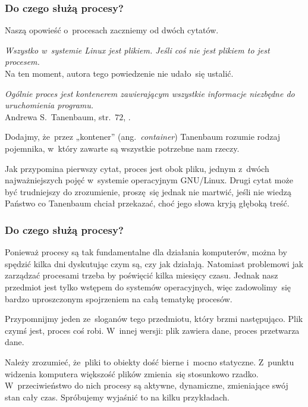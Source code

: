 \documentclass[10pt,t]{beamer}
\begin{document}
\begin{frame}
  \frametitle{Do czego służą procesy?}


  Naszą opowieść o~procesach zaczniemy od dwóch cytatów.

  \textit{Wszystko w~systemie Linux jest plikiem. Jeśli coś nie jest
    plikiem to jest procesem.} \\
  Na ten moment, %
  autora tego powiedzenie nie udało~się ustalić.

  \textit{Ogólnie proces jest kontenerem zawierającym wszystkie informacje
    niezbędne do uruchomienia programu.} \\
  Andrewa S.~Tanenbaum, str.~$72$,
  \parencite{Tanenbaum-Systemy-operacyjne-Wydanie-III-Pub-2013}.

  Dodajmy, że~przez „kontener” (ang.~\textit{container}) Tanenbaum rozumie
  rodzaj pojemnika, w~który zawarte są wszystkie potrzebne nam rzeczy.

  Jak przypomina pierwszy cytat, proces jest obok pliku, jednym z~dwóch
  najważniejszych pojęć w~systemie operacyjnym GNU/Linux. Drugi cytat
  może być trudniejszy do zrozumienie, proszę~się jednak nie martwić,
  jeśli nie wiedzą Państwo co Tanenbaum chciał przekazać, choć jego słowa
  kryją głęboką treść.

\end{frame}





\begin{frame}
  \frametitle{Do czego służą procesy?}


  Ponieważ procesy są tak fundamentalne dla działania komputerów, można
  by spędzić kilka dni dyskutując czym są, czy jak działają. Natomiast
  problemowi jak zarządzać procesami trzeba by poświęcić kilka miesięcy
  czasu. Jednak nasz przedmiot jest tylko wstępem do systemów operacyjnych,
  więc zadowolimy~się bardzo \alert{uproszczonym} spojrzeniem na całą
  tematykę procesów.

  Przypomnijmy jeden ze~sloganów tego przedmiotu, który brzmi następująco.
  Plik czymś jest, proces coś robi. W~innej wersji: plik zawiera dane,
  proces przetwarza dane.

  Należy zrozumieć, że~pliki to obiekty dość bierne i~mocno statyczne.
  Z~punktu widzenia komputera większość plików zmienia~się stosunkowo
  rzadko. W~przeciwieństwo do nich procesy są aktywne, dynamiczne,
  zmieniające swój stan cały czas. Spróbujemy wyjaśnić to na kilku
  przykładach.

\end{frame}
\end{document}
